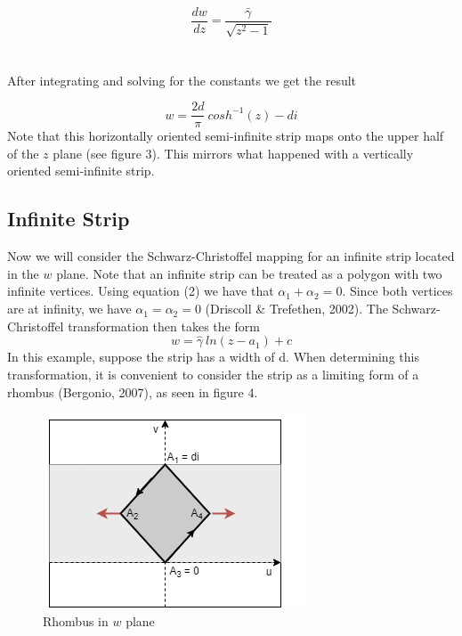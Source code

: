 \documentclass{article}
\begin{document}
    
    \begin{equation}
        \frac{dw}{dz} = \frac{\bar{\gamma}}{\sqrt{z^{2} - 1}}
    \end{equation}
    \\
    \\
    
    After integrating and solving for the constants we get the result
    
    \begin{equation}
        w = \frac{2d}{\pi} \ cosh^{-1}(z) - di
    \end{equation}
    Note that this horizontally oriented semi-infinite strip maps onto the upper half of the $z$ plane (see figure 3). This mirrors what happened with a vertically oriented semi-infinite strip.  

\subsection{Infinite Strip} 
    Now we will consider the Schwarz-Christoffel mapping for an infinite strip located in the $w$ plane. Note that an infinite strip can be treated as a polygon with two infinite vertices. Using equation (2) we have that \(\alpha_{1} + \alpha_{2} = 0\). Since both vertices are at infinity, we have \(\alpha_{1} = \alpha_{2} = 0\) (Driscoll \& Trefethen, 2002). The Schwarz-Christoffel transformation then takes the form 
    \begin{equation}
        w = \hat{\gamma} \ ln(z-a_{1}) + c
    \end{equation}
    In this example, suppose the strip has a width of d. When determining this transformation, it is convenient to consider the strip as a limiting form of a rhombus (Bergonio, 2007), as seen in figure 4. 
    \begin{figure}
        \centering            
        \includegraphics[scale = 0.75]{Infinite channel- rhombus (2).png}
        \caption{Rhombus in $w$ plane}
        \label{fig:my_label}
    \end{figure}
\end{document}
